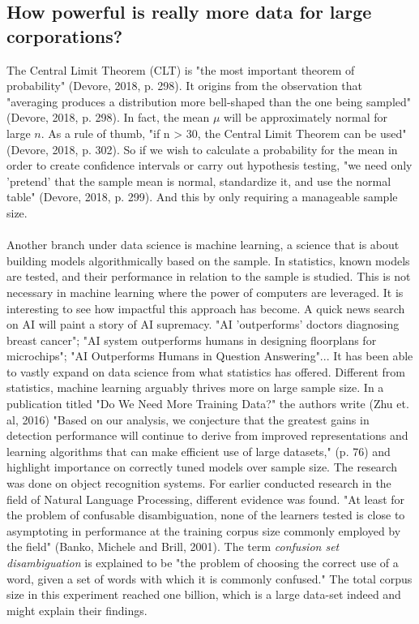 \documentclass[11pt]{article}
\begin{document}
\subsection{How powerful is really more data for large corporations?}
The Central Limit Theorem (CLT) is "the most important theorem of probability" (Devore, 2018, p. 298). It origins from the observation that "averaging produces a distribution more bell-shaped than the one being sampled" (Devore, 2018, p. 298). In fact, the mean $\mu$ will be approximately normal for large $n$. As a rule of thumb, "if n > 30, the Central Limit Theorem can be used" (Devore, 2018, p. 302). So if we wish to calculate a probability for the mean in order to create confidence intervals or carry out hypothesis testing, "we need only 'pretend' that the sample mean is normal, standardize it, and use the normal table" (Devore, 2018, p. 299). And this by only requiring a manageable sample size. 
\\ \\
Another branch under data science is machine learning, a science that is about building models algorithmically based on the sample. In statistics, known models are tested, and their performance in relation to the sample is studied. This is not necessary in machine learning where the power of computers are leveraged. It is interesting to see how impactful this approach has become. A quick news search on AI will paint a story of AI supremacy. "AI 'outperforms' doctors diagnosing breast cancer"; "AI system outperforms humans in designing floorplans for microchips"; "AI Outperforms Humans in Question Answering"... It has been able to vastly expand on data science from what statistics has offered. Different from statistics, machine learning arguably thrives more on large sample size. In a publication titled "Do We Need More Training Data?" the authors write (Zhu et. al, 2016) "Based on our analysis, we conjecture that the greatest gains in detection performance will continue to derive from improved representations and learning algorithms that can make efficient use of large datasets," (p. 76) and highlight importance on correctly tuned models over sample size. The research was done on object recognition systems. For earlier conducted research in the field of Natural Language Processing, different evidence was found. "At least for the problem of confusable disambiguation, none of the learners tested is close to asymptoting in performance at the training corpus size commonly employed by the field" (Banko, Michele and Brill, 2001). The term \textit{confusion set disambiguation} is explained to be "the problem of choosing the correct use of a word, given a set of words with which it is commonly confused." The total corpus size in this experiment reached one billion, which is a large data-set indeed and might explain their findings. 
\\
\end{document}
